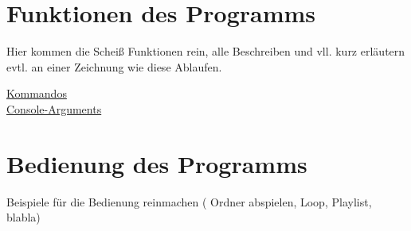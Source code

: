 \section{Funktionen des Programms}
Hier kommen die Scheiß Funktionen rein, alle Beschreiben und vll. kurz erläutern evtl. an einer Zeichnung wie diese Ablaufen.

\href{https://github.com/alexanderklapdor/RaspberryPi_Go_Audioplayer#commands-of-the-client}{Kommandos}
\\
\href{https://github.com/alexanderklapdor/RaspberryPi_Go_Audioplayer#console-arguments}{Console-Arguments}


\section{Bedienung des Programms}
Beispiele für die Bedienung reinmachen ( Ordner abspielen, Loop, Playlist, blabla)

